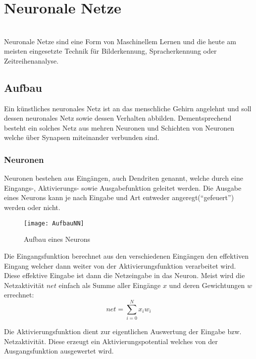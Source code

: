     \section{Neuronale Netze}
    \cite[Vgl. im Folgenden]{EinfuehrunginNN,WissensbasierteSysteme}\\
    Neuronale Netze sind eine Form von Maschinellem Lernen und die heute am meisten eingesetzte Technik für Bilderkennung, Spracherkennung oder Zeitreihenanalyse.
    
    \subsection*{Aufbau}
    Ein künstliches neuronales Netz ist an das menschliche Gehirn angelehnt und soll dessen neuronales Netz sowie dessen Verhalten abbilden. 
    Dementsprechend besteht ein solches Netz aus mehren Neuronen und Schichten von Neuronen welche über Synapsen miteinander verbunden sind.


    \subsubsection{Neuronen}
    Neuronen bestehen aus Eingängen, auch Dendriten genannt, welche durch eine Eingangs-, Aktivierungs- sowie Ausgabefunktion geleitet werden.
    Die Ausgabe eines Neurons kann je nach Eingabe und Art entweder angeregt("`gefeuert"') werden oder nicht.
    
    \begin{figure}[H]
        \centering
        \texttt{[image: AufbauNN]}
        \caption{Aufbau eines Neurons}
        \label{fig:AufbauNN}
    \end{figure}
    
    \noindent
    Die Eingangsfunktion berechnet aus den verschiedenen Eingängen den effektiven Eingang welcher dann weiter von der Aktivierungsfunktion verarbeitet wird.
    Diese effektive Eingabe ist dann die Netzeingabe in das Neuron.
    Meist wird die Netzaktivität \(net\) einfach als Summe aller Eingänge \(x\) und deren Gewichtungen \(w\) errechnet:
    \begin{equation}
        net = \sum_{i=0}^N x_i w_i
    \end{equation}
    \newline

    \noindent
    Die Aktivierungsfunktion dient zur eigentlichen Auswertung der Eingabe bzw. Netzaktivität.
    Diese erzeugt ein Aktivierungspotential welches von der Ausgangsfunktion ausgewertet wird.
    \newline
    

